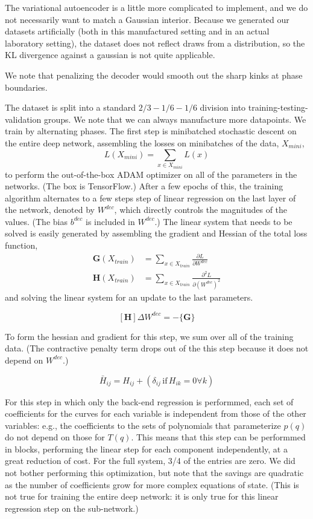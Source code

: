 \documentclass[AMA,STIX1COL]{WileyNJD-v2}
\begin{document}
The variational autoencoder is a little more complicated to implement,
and we do not necessarily want to match a Gaussian interior. Because we
generated our datasets artificially (both in this manufactured setting
and in an actual laboratory setting), the dataset does not reflect draws
from a distribution, so the KL divergence against a gaussian is not
quite applicable.

We note that penalizing the decoder would smooth out the sharp kinks at
phase boundaries.

The dataset is split into a standard $2/3-1/6-1/6$ division into
training-testing-validation groups. We note that we can always
manufacture more datapoints. We train by alternating phases. The first
step is minibatched stochastic descent on the entire deep network, assembling the losses on minibatches of the data, $X_{mini}$,
\begin{equation}
  L(X_{mini}) = \sum_{x\in X_{mini}} L(x)
  \end{equation}
to perform the out-of-the-box ADAM optimizer on all of the
parameters in the networks. (The box is
TensorFlow.) After a few epochs of this,
the training algorithm alternates to a few steps step of linear regression on the last layer of the network,
denoted by \(W^{dec}\), which directly controls the magnitudes of the values.
(The bias $b^{dec}$ is included in $W^{dec}$.) The linear
system that needs to be solved is easily generated by assembling the
gradient and Hessian of the total loss function,
\begin{align}
 \mathbf{G}\left(X_{train}\right) &= \sum_{x\in X_{train}}\frac{\partial L}{\partial W^{dec}} \\
\mathbf{H}\left(X_{train}\right) &= \sum_{x\in X_{train}}\frac{\partial^2 L}{\partial (W^{dec})^2}
\end{align}
and solving the linear system for an update to the last parameters.

\[[\mathbf{H}] \Delta W^{dec} = -\{\mathbf{G}\}\]

To form the hessian and gradient for this step, we sum over all of the
training data. (The contractive penalty term drops out of the this step because it does
not depend on \(W^{dec}\).)

\begin{equation}
\bar{H}_{ij} = H_{ij} + \left(\delta_{ij}\,\text{if}\,H_{ik}=0\forall k\right)
  \end{equation}

For this step in which only the back-end regression is performmed, each set of coefficients for the curves for each variable is independent from those of the other variables: e.g., the coefficients to the sets of polynomials that parameterize $p(q)$ do not depend on those for $T(q)$. This means that this step can be performmed in blocks, performing the linear step for each component independently, at a great reduction of cost. For the full system, 3/4 of the entries are zero. We did not bother performing this optimization, but note that the savings are quadratic as the number of coefficients grow for more complex equations of state. (This is not true for training the entire deep network: it is only true for this linear regression step on the sub-network.)
\end{document}
